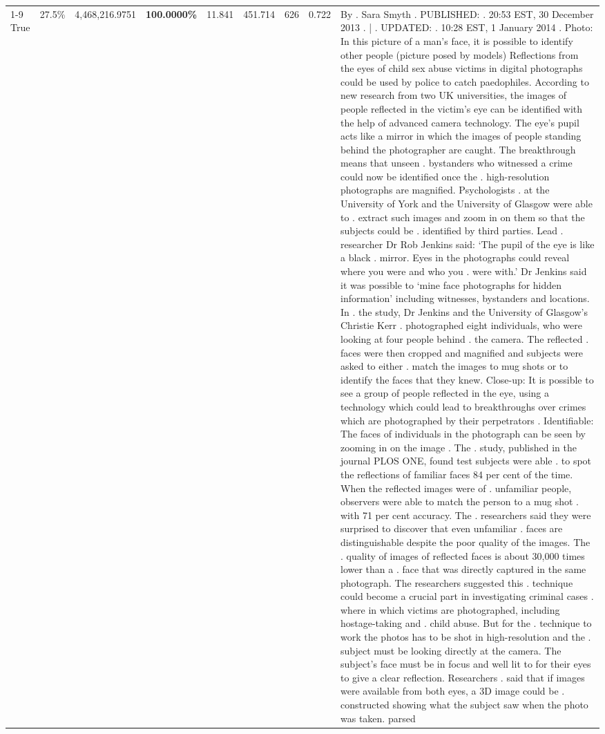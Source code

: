 \begin{table}[H]
\begin{tabular}{lllrlllll}
\cline{1-9}
True & 27.5\% & 4,468,216.9751 & \bfseries \color{red} 100.0000\% & 11.841 & 451.714 & 626 & 0.722 & By . Sara Smyth . PUBLISHED: . 20:53 EST, 30 December 2013 . | . UPDATED: . 10:28 EST, 1 January 2014 . Photo: In this picture of a man's face, it is possible to identify other people (picture posed by models) Reflections from the eyes of child sex abuse victims in digital photographs could be used by police to catch paedophiles. According to new research from two UK universities, the images of people reflected in the victim's eye can be identified with the help of advanced camera technology. The eye's pupil acts like a mirror in which the images of people standing behind the photographer are caught. The breakthrough means that unseen . bystanders who witnessed a crime could now be identified once the . high-resolution photographs are magnified. Psychologists . at the University of York and the University of Glasgow were able to . extract such images and zoom in on them so that the subjects could be . identified by third parties. Lead . researcher Dr Rob Jenkins said: ‘The pupil of the eye is like a black . mirror. Eyes in the photographs could reveal where you were and who you . were with.' Dr Jenkins said it was possible to ‘mine face photographs for hidden information' including witnesses, bystanders and locations. In . the study, Dr Jenkins and the University of Glasgow's Christie Kerr . photographed eight individuals, who were looking at four people behind . the camera. The reflected . faces were then cropped and magnified and subjects were asked to either . match the images to mug shots or to identify the faces that they knew. Close-up: It is possible to see a group of people reflected in the eye, using a technology which could lead to breakthroughs over crimes which are photographed by their perpetrators . Identifiable: The faces of individuals in the photograph can be seen by zooming in on the image . The . study, published in the journal PLOS ONE, found test subjects were able . to spot the reflections of familiar faces 84 per cent of the time. When the reflected images were of . unfamiliar people, observers were able to match the person to a mug shot . with 71 per cent accuracy. The . researchers said they were surprised to discover that even unfamiliar . faces are distinguishable despite the poor quality of the images. The . quality of images of reflected faces is about 30,000 times lower than a . face that was directly captured in the same photograph. The researchers suggested this . technique could become a crucial part in investigating criminal cases . where in which victims are photographed, including hostage-taking and . child abuse. But for the . technique to work the photos has to be shot in high-resolution and the . subject must be looking directly at the camera. The subject's face must be in focus and well lit to for their eyes to give a clear reflection. Researchers . said that if images were available from both eyes, a 3D image could be . constructed showing what the subject saw when the photo was taken. parsed \\

\end{tabular}
\end{table}
